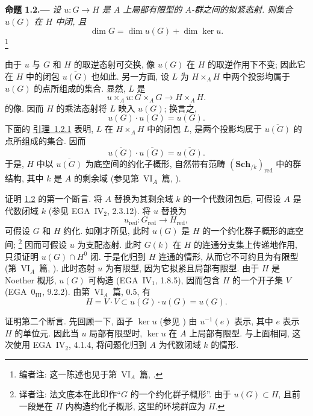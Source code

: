 \medskip
{}\label{prop:sga3-VIB-1.2}%
\noindent\textbf{命题 1.2.---}
\emph{设 \(u:G\to H\) 是 \(A\) 上局部有限型的
\(A\)-群之间的拟紧态射. 则集合 \(u(G)\) 在 \(H\) 中闭, 且}
\[
  \dim G=\dim u(G)+\dim\ker u.
\]%
\footnote{\label{note:sga3-VIB-4}编者注: 这一陈述也见于第~VI\(_A\)~篇,
.}

由于 \(u\) 与 \(G\) 和 \(H\) 的取逆态射可交换,
像 \(u(G)\) 在 \(H\) 的取逆作用下不变;
因此它在 \(H\) 中的闭包 \(\overline{u(G)}\) 也如此.
另一方面, 设 \(L\) 为 \(H\times_A H\) 中两个投影均属于 \(u(G)\)
的点所组成的集合. 显然, \(L\) 是
\[
  u\times_Au:G\times_A G\longrightarrow H\times_A H.
\]
的像. 因而 \(H\) 的乘法态射将 \(L\) 映入 \(u(G)\); 换言之,
\[
  u(G)\cdot u(G)=u(G).
\]
下面的 \hyperref[lem:sga3-VIB-1.2.1]{引理~1.2.1} 表明,
\(L\) 在 \(H\times_AH\) 中的闭包 \(\overline L\),
是两个投影均属于 \(\overline{u(G)}\) 的点所组成的集合. 因而
\[
  \overline{u(G)}\cdot\overline{u(G)}
    =\overline{u(G)}.
\]
于是, \(H\) 中以 \(\overline{u(G)}\) 为底空间的约化子概形,
自然带有范畴 \((\mathbf{Sch}_{/k})_{\mathrm{red}}\) 中的群结构,
其中 \(k\) 是 \(A\) 的剩余域
(参见第~VI\(_A\)~篇, ).

证明 \hyperref[prop:sga3-VIB-1.2]{1.2} 的第一个断言.
将 \(A\) 替换为其剩余域 \(k\) 的一个代数闭包后,
可假设 \(A\) 是代数闭域 \(k\) (参见 EGA~IV\(_2\), 2.3.12).
将 \(u\) 替换为
\[
  u_{\mathrm{red}}:G_{\mathrm{red}}\longrightarrow H_{\mathrm{red}},
\]
可假设 \(G\) 和 \(H\) 约化. 如刚才所见,
此时 \(u(G)\) 是 \(H\) 的一个约化群子概形的底空间;%
\begingroup
\renewcommand{\thefootnote}{\fnsymbol{footnote}}%
\footnote[1]{\label{note:sga3-VIB-1.2-image-ambient}译者注:
法文底本在此印作``\(G\) 的一个约化群子概形''.
由于 \(u(G)\subset H\), 且前一段是在 \(H\) 内构造约化子概形,
这里的环境群应为 \(H\).}%
\endgroup{}
因而可假设 \(u\) 为支配态射. 此时 \(G(k)\) 在 \(H\)
的连通分支集上传递地作用, 只须证明 \(u(G)\cap H^0\) 闭.
于是化归到 \(H\) 连通的情形, 从而它不可约且为有限型
(第~VI\(_A\)~篇, ).
此时态射 \(u\) 为有限型, 因为它拟紧且局部有限型.
由于 \(H\) 是 Noether 概形, \(u(G)\) 可构造
(EGA~IV\(_1\), 1.8.5), 因而包含 \(H\) 的一个开子集 \(V\)
(EGA~0\(_{\mathrm{III}}\), 9.2.2).
由第~VI\(_A\)~篇, 0.5, 有
\[
  H=V\cdot V\subset u(G)\cdot u(G)=u(G).
\]

证明第二个断言. 先回顾一下, 函子 \(\ker u\)
(参见 )
由 \(u^{-1}(e)\) 表示, 其中 \(e\) 表示 \(H\) 的单位元.
因此当 \(u\) 局部有限型时, \(\ker u\) 在 \(A\) 上局部有限型.
与上面相同, 这次使用 EGA~IV\(_2\), 4.1.4,
将问题化归到 \(A\) 为代数闭域 \(k\) 的情形.


